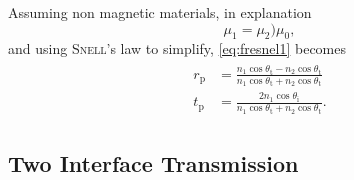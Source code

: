 \documentclass[../thesis.tex]{subfiles}
\begin{document}
        Assuming non magnetic materials, in explanation
        \begin{equation}
            \mu_1 = \mu_2 ) \mu_0,
        \end{equation}
        and using \textsc{Snell}'s law to simplify, \cref{eq:fresnel1} becomes
        \begin{align}
            \begin{split}
                r_\mathrm{p} &= \frac{n_1\cos\theta_\mathrm{t}-n_2\cos\theta_\mathrm{t}}{n_1\cos\theta_\mathrm{t}+n_2\cos\theta_\mathrm{t}}  \\
                t_\mathrm{p} &= \frac{2n_1\cos\theta_\mathrm{i}}{n_1\cos\theta_\mathrm{t}+n_2\cos\theta_\mathrm{t}}.
            \end{split}
            \label{eq:fresnel2}
        \end{align}

        


        \subsection{Two Interface Transmission}
        \label{subsec:two_interface_trans}

            
\end{document}
